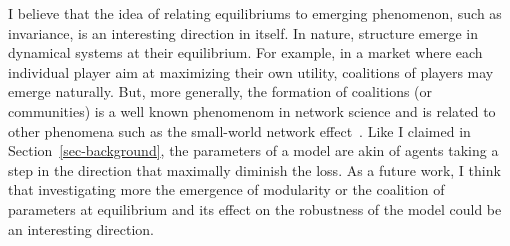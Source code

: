 I believe that the idea of relating equilibriums to emerging phenomenon, such as invariance, is an interesting direction in itself.
In nature, structure emerge in dynamical systems at their equilibrium. For example, in a market where each individual player aim at maximizing their own utility,
coalitions of players may emerge naturally. But, more generally, the formation of coalitions (or communities) is a well known phenomenom in network science and is related
to other phenomena such as the small-world network effect~\cite{Watts1998Collective}.
Like I claimed in Section~\ref{sec-background}, the parameters of a model are akin of agents taking a step in the direction that maximally
diminish the loss. As a future work, I think that investigating more the emergence of modularity or the coalition of parameters at equilibrium
and its effect on the robustness of the model could be an interesting direction.

